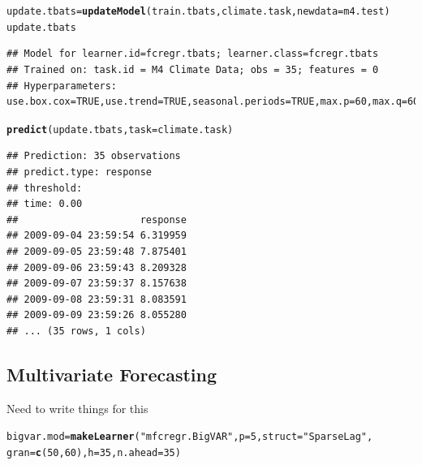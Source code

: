 \documentclass{article}\usepackage[]{graphicx}\usepackage[]{color}
\makeatletter
\newcommand{\hlnum}[1]{\textcolor[rgb]{0.686,0.059,0.569}{#1}}%
\newcommand{\hlstr}[1]{\textcolor[rgb]{0.192,0.494,0.8}{#1}}%
\newcommand{\hlstd}[1]{\textcolor[rgb]{0.345,0.345,0.345}{#1}}%
\newcommand{\hlkwb}[1]{\textcolor[rgb]{0.69,0.353,0.396}{#1}}%
\newcommand{\hlkwc}[1]{\textcolor[rgb]{0.333,0.667,0.333}{#1}}%
\newcommand{\hlkwd}[1]{\textcolor[rgb]{0.737,0.353,0.396}{\textbf{#1}}}%
\newenvironment{kframe}{%
 \def\at@end@of@kframe{}%
 \ifinner\ifhmode%
  \def\at@end@of@kframe{\end{minipage}}%
  \begin{minipage}{\columnwidth}%
 \fi\fi%
 \def\FrameCommand##1{\hskip\@totalleftmargin \hskip-\fboxsep
 \colorbox{shadecolor}{##1}\hskip-\fboxsep
     \hskip-\linewidth \hskip-\@totalleftmargin \hskip\columnwidth}%
 \MakeFramed {\advance\hsize-\width
   \@totalleftmargin\z@ \linewidth\hsize
   \@setminipage}}%
 {\par\unskip\endMakeFramed%
 \at@end@of@kframe}
\newenvironment{knitrout}{}{} %
\theoremstyle{definition}
\makeatother
\begin{document}
\begin{knitrout}
\color{fgcolor}\begin{kframe}
\begin{alltt}
\hlstd{update.tbats} \hlkwb{=} \hlkwd{updateModel}\hlstd{(train.tbats, climate.task,} \hlkwc{newdata} \hlstd{= m4.test)}
\hlstd{update.tbats}
\end{alltt}
\begin{verbatim}
## Model for learner.id=fcregr.tbats; learner.class=fcregr.tbats
## Trained on: task.id = M4 Climate Data; obs = 35; features = 0
## Hyperparameters: use.box.cox=TRUE,use.trend=TRUE,seasonal.periods=TRUE,max.p=60,max.q=60,stationary=FALSE,use.arma.errors=TRUE,h=35
\end{verbatim}
\begin{alltt}
\hlkwd{predict}\hlstd{(update.tbats,} \hlkwc{task} \hlstd{= climate.task)}
\end{alltt}
\begin{verbatim}
## Prediction: 35 observations
## predict.type: response
## threshold: 
## time: 0.00
##                     response
## 2009-09-04 23:59:54 6.319959
## 2009-09-05 23:59:48 7.875401
## 2009-09-06 23:59:43 8.209328
## 2009-09-07 23:59:37 8.157638
## 2009-09-08 23:59:31 8.083591
## 2009-09-09 23:59:26 8.055280
## ... (35 rows, 1 cols)
\end{verbatim}
\end{kframe}
\end{knitrout}

\subsection{Multivariate Forecasting}

Need to write things for this

\begin{knitrout}
\color{fgcolor}\begin{kframe}
\begin{alltt}
\hlstd{bigvar.mod} \hlkwb{=} \hlkwd{makeLearner}\hlstd{(}\hlstr{"mfcregr.BigVAR"}\hlstd{,}\hlkwc{p} \hlstd{=} \hlnum{5}\hlstd{,} \hlkwc{struct} \hlstd{=} \hlstr{"SparseLag"}\hlstd{,}
                         \hlkwc{gran} \hlstd{=} \hlkwd{c}\hlstd{(}\hlnum{50}\hlstd{,} \hlnum{60}\hlstd{),}\hlkwc{h} \hlstd{=} \hlnum{35}\hlstd{,} \hlkwc{n.ahead} \hlstd{=} \hlnum{35}\hlstd{)}
\end{alltt}
\end{kframe}
\end{knitrout}
\end{document}
